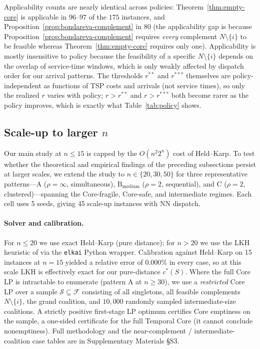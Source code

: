 \documentclass[11pt]{article}
\theoremstyle{plain}
\theoremstyle{definition}
\theoremstyle{remark}
\newcommand{\F}{\mathcal{F}}
\begin{document}
Applicability counts are nearly identical across policies: Theorem~\ref{thm:empty-core} is applicable in $96$--$97$ of the $175$ instances, and Proposition~\ref{prop:bondareva-complement} in $80$ (the applicability gap is because Proposition~\ref{prop:bondareva-complement} requires \emph{every} complement $N\setminus\{i\}$ to be feasible whereas Theorem~\ref{thm:empty-core} requires only one). Applicability is mostly insensitive to policy because the feasibility of a specific $N\setminus\{i\}$ depends on the overlap of service-time windows, which is only weakly affected by dispatch order for our arrival patterns. The thresholds $r^{\ast\ast}$ and $r^{\ast\ast\ast}$ themselves are policy-independent as functions of TSP costs and arrivals (not service times), so only the realized $r$ varies with policy; $r>r^{\ast\ast}$ and $r>r^{\ast\ast\ast}$ both become rarer as the policy improves, which is exactly what Table~\ref{tab:policy} shows.

\subsection{Scale-up to larger \texorpdfstring{$n$}{n}}
\label{ssec:scaleup}

Our main study at $n\le 15$ is capped by the $O(n^2 2^n)$ cost of Held--Karp. To test whether the theoretical and empirical findings of the preceding subsections persist at larger scales, we extend the study to $n\in\{20,30,50\}$ for three representative patterns---A ($\rho=\infty$, simultaneous), $\text{B}_{\text{medium}}$ ($\rho=2$, sequential), and C ($\rho=2$, clustered)---spanning the Core-fragile, Core-safe, and intermediate regimes. Each cell uses 5 seeds, giving 45 scale-up instances with NN dispatch.

\paragraph{Solver and calibration.} For $n\le 20$ we use exact Held--Karp (pure distance); for $n>20$ we use the LKH heuristic of \citet{helsgaun2000effective} via the \texttt{elkai} Python wrapper. Calibration against Held--Karp on 15 instances at $n=15$ yielded a relative error of $0.000\%$ in every case, so at this scale LKH is effectively exact for our pure-distance $c^{\ast}(S)$. Where the full Core LP is intractable to enumerate (pattern A at $n\ge 30$), we use a \emph{restricted} Core LP over a sample $\mathcal{S}\subseteq\F$ consisting of all singletons, all feasible complements $N\setminus\{i\}$, the grand coalition, and $10{,}000$ randomly sampled intermediate-size coalitions. A strictly positive first-stage LP optimum certifies Core emptiness on the sample, a one-sided certificate for the full Temporal Core (it cannot conclude nonemptiness). Full methodology and the near-complement / intermediate-coalition case tables are in Supplementary Materials \S S3.
\end{document}
